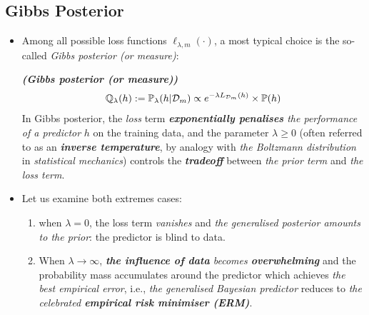 \documentclass[11pt]{article}
\begin{document}
\subsection{Gibbs Posterior}
\begin{itemize}
\item 
Among all possible loss functions $\ell_{\lambda, m}(\cdot)$, a most typical choice is the so-called \emph{Gibbs posterior (or measure)}:
\begin{definition}\emph{\textbf{(Gibbs posterior (or measure))}}
\begin{align}
{\mathbb Q}_{\lambda}(h) :={\mathbb P}_{\lambda}(h | {\mathcal D}_m) \propto e^{-\lambda L_{{\mathcal D}_{m}}(h)}  \times {\mathbb P}(h) \label{eqn: gibbs_posterior_dist}
\end{align} In Gibbs posterior, the \emph{loss} term \emph{\textbf{exponentially penalises} the performance of a predictor} $h$ on the training data, and the parameter $\lambda \ge 0$ (often referred to as an \emph{\textbf{inverse temperature}}, by analogy with \emph{the Boltzmann distribution} in \emph{statistical mechanics}) controls the \emph{\textbf{tradeoff}} between \emph{the prior term} and \emph{the loss term}.
\end{definition}

\item \begin{remark}
Let us examine both extremes cases:
\begin{enumerate}
\item  when $\lambda = 0$, the loss term \emph{vanishes} and \emph{the generalised posterior amounts to the prior}: the
predictor is blind to data. 
\item When $\lambda \to \infty$, \emph{\textbf{the influence of data} becomes \textbf{overwhelming}} and the probability mass accumulates around the predictor  which achieves \emph{the best empirical error}, i.e., \emph{the generalised Bayesian predictor} reduces to \emph{the celebrated \textbf{empirical risk minimiser (ERM)}}.
\end{enumerate}
\end{remark}


\end{itemize}
\end{document}
